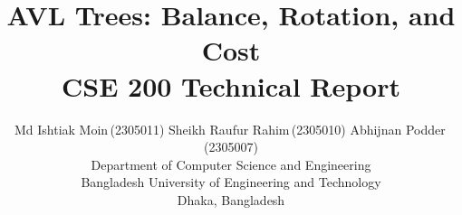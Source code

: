 \documentclass[11pt,a4paper]{article}
\title{\bfseries AVL Trees: Balance, Rotation, and Cost\\[7pt]
       \large\mdseries CSE 200 Technical Report}
\author{%
  Md Ishtiak Moin\,{\small(2305011)} \quad
  Sheikh Raufur Rahim\,{\small(2305010)} \quad
  Abhijnan Podder\,{\small(2305007)} \\[7pt]
  \normalsize Department of Computer Science and Engineering \\
  \normalsize Bangladesh University of Engineering and Technology \\
  \normalsize Dhaka, Bangladesh
}
\date{}
\begin{document}
\maketitle

\begin{abstract}

\end{abstract}

















\appendix

\end{document}
